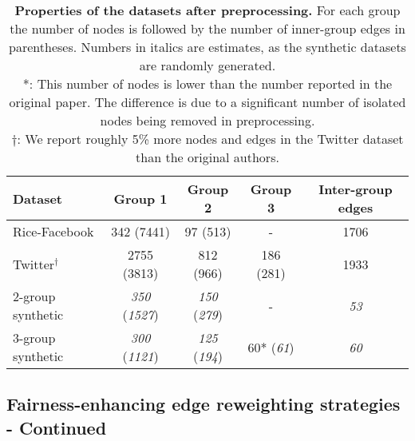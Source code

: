 \begin{table}[!htbp]
    \centering
    \begin{tabular}{lcccc}
        \toprule
        \textbf{Dataset} & \textbf{Group 1} & \textbf{Group 2} & \textbf{Group 3} & \textbf{Inter-group edges} \\
        \midrule
        Rice-Facebook & 342 (7441) & 97 (513) & - & 1706 \\
        Twitter$^\dagger$ & 2755 (3813) & 812 (966) & 186 (281) & 1933 \\
        2-group synthetic & \textit{350} (\textit{1527}) & \textit{150} (\textit{279}) & - & \textit{53} \\
        3-group synthetic & \textit{300} (\textit{1121}) & \textit{125} (\textit{194}) & 60* (\textit{61}) & \textit{60} \\
        \bottomrule
    \end{tabular}
    \caption{\textbf{Properties of the datasets after preprocessing.} For each group the number of nodes is followed by the number of inner-group edges in parentheses. Numbers in italics are estimates, as the synthetic datasets are randomly generated. \\
    *: This number of nodes is lower than the number reported in the original paper. The difference is due to a significant number of isolated nodes being removed in preprocessing.\\
    $\dagger$:  We report roughly 5\% more nodes and edges in the Twitter dataset than the original authors. }
    \label{tab:dataset-overview}
\end{table}

\subsection{Fairness-enhancing edge reweighting strategies - Continued}
\label{subsec:reweighting-cont}
